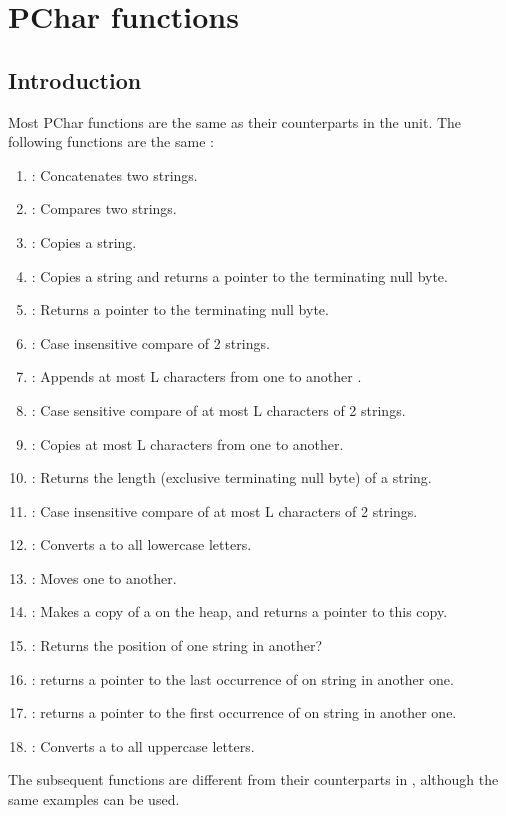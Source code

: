 

\section{PChar functions}

\subsection{Introduction}

Most PChar functions are the same as their counterparts in the 
unit. The following functions are the same :

\begin{enumerate}
\item {} : Concatenates two  strings.
\item {} : Compares two  strings.
\item {} : Copies a  string.
\item {} : Copies a  string and returns a pointer to
the terminating null byte.
\item {} : Returns a pointer to the terminating null byte.
\item {} : Case insensitive compare of 2  strings.
\item {} : Appends at most L characters from one  to
another .
\item {} : Case sensitive compare of at most L characters of 2
  strings.
\item {} : Copies at most L characters from one  to
another.
\item {} : Returns the length (exclusive terminating null byte)
of a  string.
\item {} : Case insensitive compare of at most L characters of 2
  strings.  
\item {} : Converts a  to all lowercase letters.
\item {} : Moves one  to another.
\item {} : Makes a copy of a  on the heap, and returns
a pointer to this copy.
\item {} : Returns the position of one  string in
another?
\item {} : returns a pointer to the last occurrence of on 
  string in another one.
\item {} : returns a pointer to the first occurrence of on 
  string in another one.
\item {} : Converts a  to all uppercase letters.
\end{enumerate}
The subsequent functions are different from their counterparts in
, although the same examples can be used.


